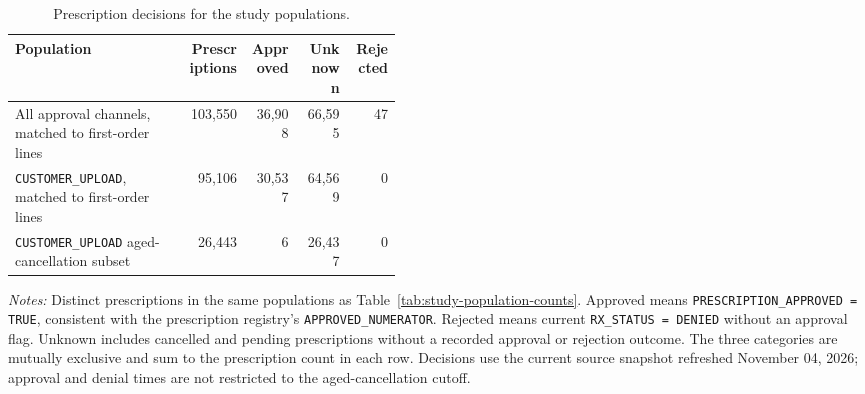 \begin{table}[htbp]
\centering
\caption{Prescription decisions for the study populations.}
\label{tab:study-population-prescription-decisions}
\small
\begin{tabular}{@{}>{\raggedright\arraybackslash}p{0.45\linewidth}rrrr@{}}
\toprule
Population & Prescriptions & Approved & Unknown & Rejected \\
\midrule
All approval channels, matched to first-order lines & 103,550 & 36,908 & 66,595 & 47 \\
\texttt{CUSTOMER\_UPLOAD}, matched to first-order lines & 95,106 & 30,537 & 64,569 & 0 \\
\texttt{CUSTOMER\_UPLOAD} aged-cancellation subset & 26,443 & 6 & 26,437 & 0 \\
\bottomrule
\end{tabular}

\begin{minipage}{\linewidth}
\footnotesize
\textit{Notes:} Distinct prescriptions in the same populations as
Table~\ref{tab:study-population-counts}. Approved means
\texttt{PRESCRIPTION\_APPROVED = TRUE}, consistent with the prescription registry's
\texttt{APPROVED\_NUMERATOR}. Rejected means current \texttt{RX\_STATUS = DENIED}
without an approval flag. Unknown includes cancelled and pending prescriptions
without a recorded approval or rejection outcome. The three categories are
mutually exclusive and sum to the prescription count in each row.
Decisions use the current source snapshot refreshed November 04, 2026;
approval and denial times are not restricted to the aged-cancellation cutoff.
\end{minipage}
\end{table}

